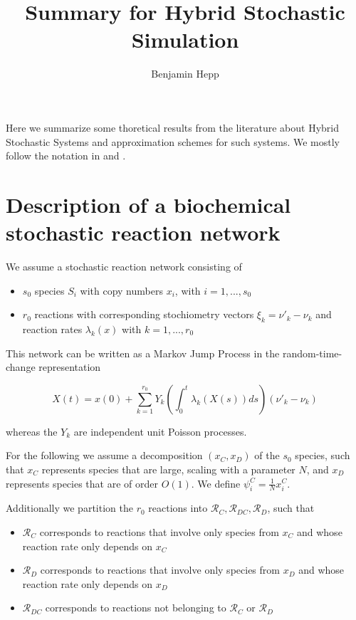 \documentclass[english]{article}
\begin{document}
\title{Summary for Hybrid Stochastic Simulation}

\author{Benjamin Hepp}

\maketitle
Here we summarize some thoretical results from the literature about
Hybrid Stochastic Systems and approximation schemes for such systems.
We mostly follow the notation in \cite{crudu2012convergence} and
\cite{kang2013separation}.


\section{Description of a biochemical stochastic reaction network}

We assume a stochastic reaction network consisting of
\begin{itemize}
\item $s_{0}$ species $S_{i}$ with copy numbers $x_{i}$,
    with $i=1,...,s_{0}$
\item $r_{0}$ reactions with corresponding stochiometry vectors
    $\xi_{k} = \nu'_{k} - \nu{}_{k}$ and reaction rates
    $\lambda_{k}\left(x\right)$ with $k=1,...,r_{0}$
\end{itemize}
This network can be written as a Markov Jump Process in
the random-time-change representation

\[
    X(t) = x(0) + \sum_{k=1}^{r_{0}} Y_{k} \left(
        \int_{0}^{t} \lambda_{k} \left( X(s) \right) ds
    \right) \left( \nu'_{k} - \nu_{k} \right)
\]


whereas the $Y_{k}$ are independent unit Poisson processes.

For the following we assume a decomposition $\left(x_{C},x_{D}\right)$
of the $s_{0}$ species, such that $x_{C}$ represents species that
are large, scaling with a parameter $N$, and $x_{D}$ represents
species that are of order $O(1)$. We define
$\psi_{i}^{C} = \frac{1}{N} x_{i}^{C}$.

Additionally we partition the $r_{0}$ reactions into
$\mathcal{R}_{C}, \mathcal{R}_{DC}, \mathcal{R}_{D}$, such that
\begin{itemize}
\item $\mathcal{R}_{C}$ corresponds to reactions that involve only
    species from $x_{C}$ and whose reaction rate only depends
    on $x_{C}$
\item $\mathcal{R}_{D}$ corresponds to reactions that involve only
    species from $x_{D}$ and whose reaction rate only depends
    on $x_{D}$
\item $\mathcal{R}_{DC}$ corresponds to reactions not belonging to
    $\mathcal{R}_{C}$ or $\mathcal{R}_{D}$
\end{itemize}
\end{document}
